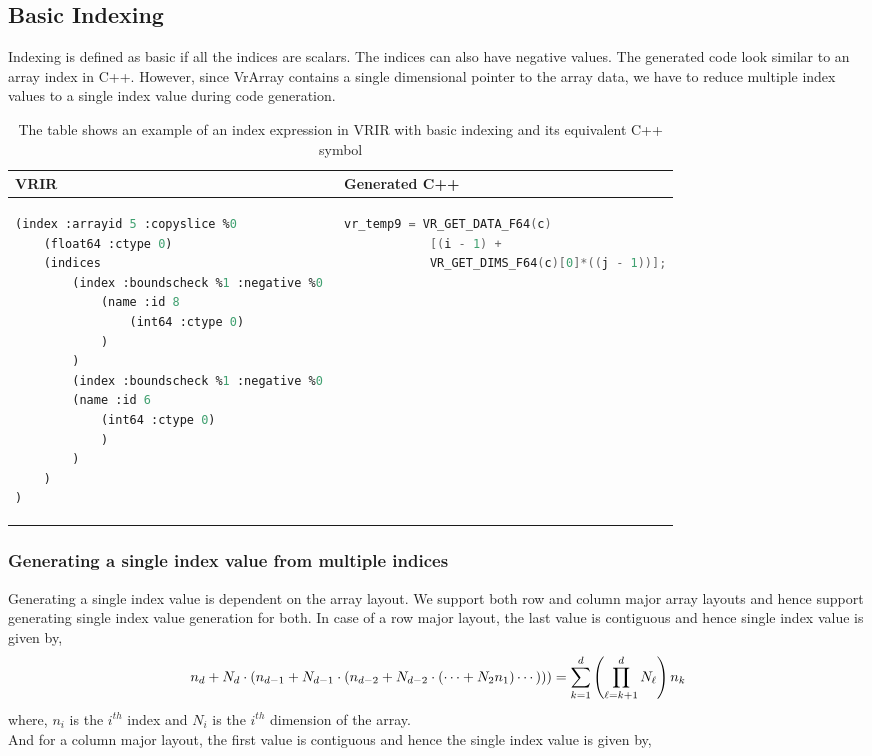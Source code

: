 \subsection{Basic Indexing}
\label{subsec:basicindexing}
Indexing is defined as basic if all the indices are scalars. The indices can also have negative values. The generated code look similar to an array index in C++. However, since VrArray contains a single dimensional pointer to the array data, we have to reduce multiple index values to a single index value during code generation. 
\begin{table}[htbp]
\centering
\begin{tabular}{|l|l|}
\hline

VRIR &  Generated C++ \\
\hline
{
\begin{lstlisting}[language=lisp,frame=none, numbers=none]
(index :arrayid 5 :copyslice %0
	(float64 :ctype 0)
	(indices 
		(index :boundscheck %1 :negative %0 
			(name :id 8 
				(int64 :ctype 0)
			)
		)
		(index :boundscheck %1 :negative %0 
   		(name :id 6 
   			(int64 :ctype 0)
			)
		)
	)
)
\end{lstlisting}
}
&
{
\begin{lstlisting}[language=c,frame=none, numbers=none]
vr_temp9 = VR_GET_DATA_F64(c) 
			[(i - 1) + 
			VR_GET_DIMS_F64(c)[0]*((j - 1))];
\end{lstlisting}
} \\
\hline
\end{tabular}
\caption[Basic array indexing example]{The table shows an example of an index expression in VRIR  with basic indexing and its equivalent C++ symbol}
\label{tab:basicIndex}
\end{table}
\subsubsection{ Generating a single index value from multiple indices}
Generating a single index value is dependent on the array layout. We support both row and column major array layouts and hence support generating single index value generation for both. In case of a row major layout, the last value is contiguous and hence single index value is given by,
\begin{equation}
n_d + N_d \cdot (n_{d-1} + N_{d-1} \cdot (n_{d-2} + N_{d-2} \cdot (\cdots + N_2 n_1)\cdots)))
= \sum_{k=1}^d \left( \prod_{\ell=k+1}^d N_\ell \right) n_k \\
\end{equation} 
 where, $n_i$ is the $i^{th}$ index and  $N_i$ is the $i^{th}$ dimension of the array. \\
And for a column major  layout, the first value is contiguous and hence the single index value is given by,

